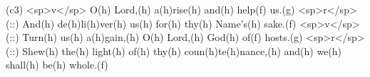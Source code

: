 (c3) <sp>v</sp> O(h) Lord,(h) a(h)rise(h) and(h) help(f) us.(g)
<sp>r</sp>(::) And(h) de(h)li(h)ver(h) us(h) for(h) thy(h) Name's(h) sake.(f)
<sp>v</sp>(::) Turn(h) us(h) a(h)gain,(h) O(h) Lord,(h) God(h) of(f) hosts.(g)
<sp>r</sp>(::) Shew(h) the(h) light(h) of(h) thy(h) coun(h)te(h)nance,(h) and(h) we(h) shall(h) be(h) whole.(f)